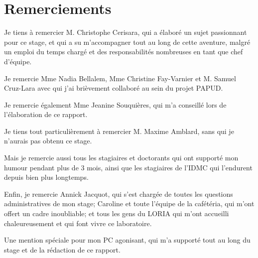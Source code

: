 \maketitle
	
	
\makesecondtitle

\section*{Remerciements}
\pagestyle{empty}
{
	Je tiens à remercier M. Christophe Cerisara, qui a élaboré un sujet passionnant pour ce stage, et qui a su m'accompagner tout au long de cette aventure, malgré un emploi du temps chargé et des responsabilités nombreuses en tant que chef d'équipe.
	
	Je remercie Mme Nadia Bellalem, Mme Christine Fay-Varnier et M. Samuel Cruz-Lara avec qui j'ai brièvement collaboré au sein du projet PAPUD.
	
	Je remercie également Mme Jeanine Souquières, qui m'a conseillé lors de l'élaboration de ce rapport.
	
	Je tiens tout particulièrement à remercier 
	M. Maxime Amblard, sans qui je n'aurais pas obtenu ce stage.
	
	Mais je remercie aussi tous les stagiaires et doctorants qui ont supporté mon humour pendant plus de 3 mois, ainsi que les stagiaires de l'IDMC qui l'endurent depuis bien plus longtemps.
	
	Enfin, je remercie Annick Jacquot, qui s'est chargée de toutes les questions administratives de mon stage; Caroline et toute l'équipe de la cafétéria, qui m'ont offert un cadre inoubliable; et tous les gens du LORIA qui m'ont accueilli chaleureusement et qui font vivre ce laboratoire.
	
	Une mention spéciale pour mon PC agonisant, qui m'a supporté tout au long du stage et de la rédaction de ce rapport.
}


